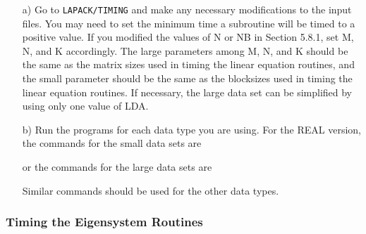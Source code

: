 \begin{itemize}

\item[a)]
Go to {\tt LAPACK/TIMING} and
make any necessary modifications to the input files.
You may need to set the minimum time a subroutine will
be timed to a positive value.
If you modified the values of N or NB 
in Section 5.8.1, set M, N, and K accordingly.
The large parameters among M, N, and K
should be the same as the matrix sizes used in timing the linear
equation routines,
and the small parameter should be the same as the
blocksizes used in timing the linear equation routines.
If necessary, the large data set can be simplified by using only one
value of LDA.

\item[b)]
Run the programs for each data type you are using. 
For the REAL version, the commands for the small data sets are

or the commands for the large data sets are

\noindent
Similar commands should be used for the other data types.

\end{itemize}

\subsubsection{Timing the Eigensystem Routines}

